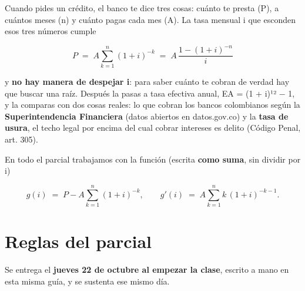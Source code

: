 
\newcommand{\docpie}{Parcial 1 · Raíces C · Crédito}

Cuando pides un crédito, el banco te dice tres cosas: cuánto te presta (P), a cuántos meses (n) y cuánto pagas cada mes (A). La tasa mensual i que esconden esos tres números cumple

\[P \;=\; A\sum_{k=1}^{n}(1+i)^{-k} \;=\; A\,\frac{1-(1+i)^{-n}}{i}\]

y \textbf{no hay manera de despejar i}: para saber cuánto te cobran de verdad hay que buscar una raíz. Después la pasas a tasa efectiva anual, EA = (1 + i)¹² − 1, y la comparas con dos cosas reales: lo que cobran los bancos colombianos según la \textbf{Superintendencia Financiera} (datos abiertos en datos.gov.co) y la \textbf{tasa de usura}, el techo legal por encima del cual cobrar intereses es delito (Código Penal, art. 305).

En todo el parcial trabajamos con la función (escrita \textbf{como suma}, sin dividir por i)

\[g(i) \;=\; P - A\sum_{k=1}^{n}(1+i)^{-k}, \qquad g'(i) \;=\; A\sum_{k=1}^{n}k\,(1+i)^{-k-1}.\]

\section{Reglas del parcial}

Se entrega el \textbf{jueves 22 de octubre al empezar la clase}, escrito a mano en esta misma guía, y se sustenta ese mismo día.

